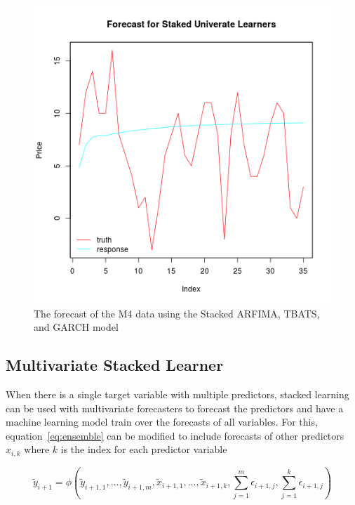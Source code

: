 \documentclass[12pt]{article}\usepackage[]{graphicx}\usepackage[]{color}
\theoremstyle{definition}
\begin{document}
\begin{figure}[h!]
\includegraphics[width=\linewidth]{ensemble_pred.png}
\centering
\caption{The forecast of the M4 data using the Stacked ARFIMA, TBATS, and GARCH model}
\label{fig:ensemble_final}
\end{figure}

\doublespacing

\subsection{Multivariate Stacked Learner}
\label{sub:multiStack}

When there is a single target variable with multiple predictors, stacked learning can be used with multivariate forecasters to forecast the predictors and have a machine learning model train over the forecasts of all variables. For this, equation~\ref{eq:ensemble} can be modified to include forecasts of other predictors $x_{i,k}$ where $k$ is the index for each predictor variable

\begin{equation}
\tilde{y}_{i+1} = \phi(\tilde{y}_{i+1,1},\dots, \tilde{y}_{i+1,m}, \tilde{x}_{i+1,1},\dots, \tilde{x}_{i+1,k}, \sum_{j=1}^m \epsilon_{i+1,j}, \sum_{j=1}^k \epsilon_{i+1,j})
\label{eq:ensembleMulti}
\end{equation}
\end{document}
